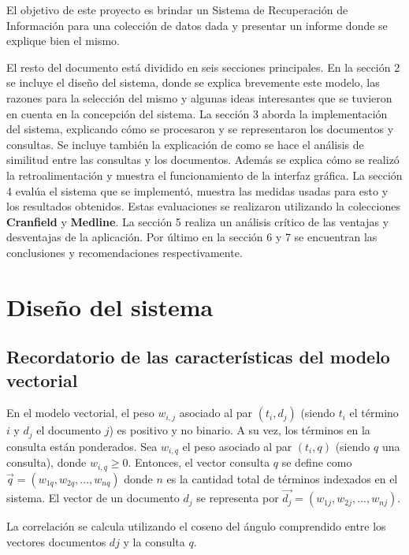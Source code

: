 \documentclass[runningheads]{llncs}
\begin{document}
El objetivo de este proyecto es brindar un Sistema de Recuperaci\'on de Informaci\'on para una colecci\'on de datos dada y presentar un informe donde se explique bien el mismo.

El resto del documento est\'a dividido en seis secciones principales. En la secci\'on 2 se incluye el dise\~{n}o del sistema, donde se explica brevemente este modelo, las razones para la selecci\'on del mismo y algunas ideas interesantes que se tuvieron en cuenta en la concepci\'on del sistema. La secci\'on 3 aborda la implementaci\'on del sistema, explicando c\'omo se procesaron y se representaron los documentos y consultas. Se incluye tambi\'en la explicaci\'on de como se hace el an\'alisis de similitud entre las consultas y los documentos. Adem\'as se explica c\'omo se realiz\'o la retroalimentaci\'on y muestra el funcionamiento de la interfaz gr\'afica. La secci\'on 4 eval\'ua el sistema que se implement\'o, muestra  las medidas usadas para esto y los resultados obtenidos. Estas evaluaciones se realizaron utilizando la colecciones \textbf{Cranfield} y \textbf{Medline}. La secci\'on 5 realiza un an\'alisis cr\'itico de las ventajas y desventajas de la aplicaci\'on. Por \'ultimo en la secci\'on 6 y 7 se encuentran las conclusiones y recomendaciones respectivamente. 

	\section{Dise\~{n}o del sistema}
	
	\subsection{Recordatorio de las caracter\'isticas del modelo vectorial}
	
	En el modelo vectorial, el peso $w_{i,j}$ asociado al par $(t_i,d_j)$ (siendo $t_i$ el t\'ermino $i$ y $d_j$ el documento $j$) es positivo y no binario. A su vez, los t\'erminos en la consulta est\'an ponderados. Sea $w_{i,q}$ el peso asociado al par $(t_i,q)$ (siendo $q$ una consulta), donde $w_{i,q}\geq 0$. Entonces, el vector consulta $q$ se define como $\overrightarrow{q}=(w_{1q},w_{2q},...,w_{nq})$ donde $n$ es la cantidad total de t\'erminos indexados en el sistema. El vector de un documento $d_j$ se representa por $\overrightarrow{d_j}=(w_{1j},w_{2j},...,w_{nj})$.
	
	La correlaci\'on se calcula utilizando el coseno del \'angulo comprendido entre los vectores documentos $dj$ y la consulta $q$.
	
\end{document}
